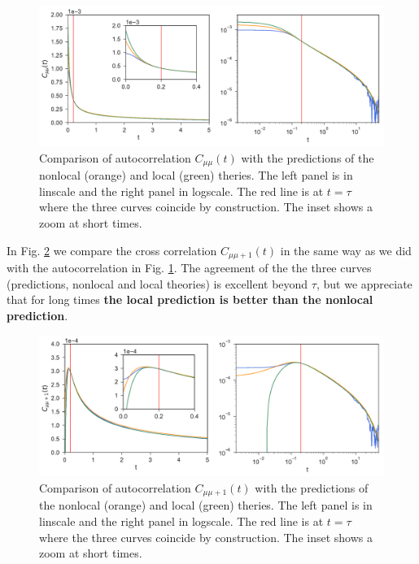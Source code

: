 \documentclass[a4paper,openright,12pt]{book}
\newcommand{\Note}[1]{{\bf \color{red}#1}}    %
\begin{document}
\begin{figure}[h!]
  \centering
\includegraphics[scale=0.45]{Predictionsmumu-PBC}
\caption[Comparison of autocorrelation $C_{\mu\mu}$ with the predicions for PBC system]{Comparison of autocorrelation $C_{\mu\mu}(t)$ with the predictions of the nonlocal (orange) and local (green) theries. The left panel is in linscale and the right panel in logscale. The red line is at $t=\tau$ where the three curves coincide by construction. The inset shows a zoom at short times.}
\label{fig:Predictionsmumu-PBC}
\end{figure}

In Fig. \ref{fig:Predictionsmumu+1-PBC} we compare the cross correlation $C_{\mu\mu+1}(t)$ in the same way as we did with the autocorrelation in Fig. \ref{fig:Predictionsmumu-PBC}. The agreement of the the three curves (predictions, nonlocal and local theories) is excellent beyond $\tau$, but we appreciate that for long times \Note{the local prediction is better than the nonlocal prediction}. 

\begin{figure}[h!]
  \centering
\includegraphics[scale=0.45]{Predictionsmumu+1-PBC}
\caption[Comparison of cross correlation $C_{\mu\mu+1}$ with the predicions for PBC system]{Comparison of autocorrelation $C_{\mu\mu+1}(t)$ with the predictions of the nonlocal (orange) and local (green) theries. The left panel is in linscale and the right panel in logscale. The red line is at $t=\tau$ where the three curves coincide by construction. The inset shows a zoom at short times.}
\label{fig:Predictionsmumu+1-PBC}
\end{figure}
\end{document}
